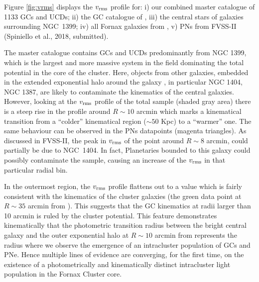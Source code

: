 \documentclass[useAMS,usenatbib]{mn2e}
\begin{document}
Figure \ref{fig:vrms} displays the $v_{\rm rms}$ profile for: i) our combined 
master catalogue of 1133 GCs and UCDs; ii) the GC catalogue of 
\citet{Schuberth}, iii) the central stars of galaxies surrounding NGC~1399; iv) 
all Fornax galaxies from \citet{Drinkwater00}, v) PNs from FVSS-II (Spiniello et al., 2018, submitted).

The master catalogue contains GCs and UCDs predominantly from NGC 1399, which 
is the largest and more massive system in the field dominating the total 
potential in the core of the cluster. Here, objects from other galaxies, 
embedded in the extended exponential halo around the galaxy \citep{Iodice16}, 
in particular NGC 1404, NGC 1387, are likely to contaminate the 
kinematics of the central galaxies. However, looking at the $v_{\rm rms}$ 
profile of the total sample (shaded gray area) there is a steep rise in the 
profile around $R\sim10$ arcmin which marks a kinematical transition from a 
``colder'' kinematical region ($\sim 50$ Kpc) to a ``warmer'' one. 
The same behaviour can be observed in the PNs datapoints 
(magenta triangles). As discussed in FVSS-II, the peak in $v_{\rm rms}$ 
of the point around $R\sim 8$ arcmin, could partially be due to NGC~1404. 
In fact, Planetaries bounded to this galaxy could possibly contaminate the sample, 
causing an increase of the $v_{\rm rms}$ in that particular radial bin.

In the outermost region, the $v_{\rm rms}$ profile flattens out to a value which is 
fairly consistent with the kinematics of the cluster galaxies (the green data 
point at $R\sim35$ arcmin from \citealt{Drinkwater00}). This suggests that the GC 
kinematics at radii larger than 10 arcmin is ruled by the cluster potential. 
This feature demonstrates kinematically that the photometric transition radius 
between the bright central galaxy and the outer exponential halo at $R\sim10$ 
arcmin from \citet{Iodice16} represents the radius where we observe the 
emergence of an intracluster population of GCs and PNe. Hence multiple lines of 
evidence are converging, for the first time, on the existence of a 
photometrically and kinematically distinct intracluster light population in the 
Fornax Cluster core.
\end{document}
